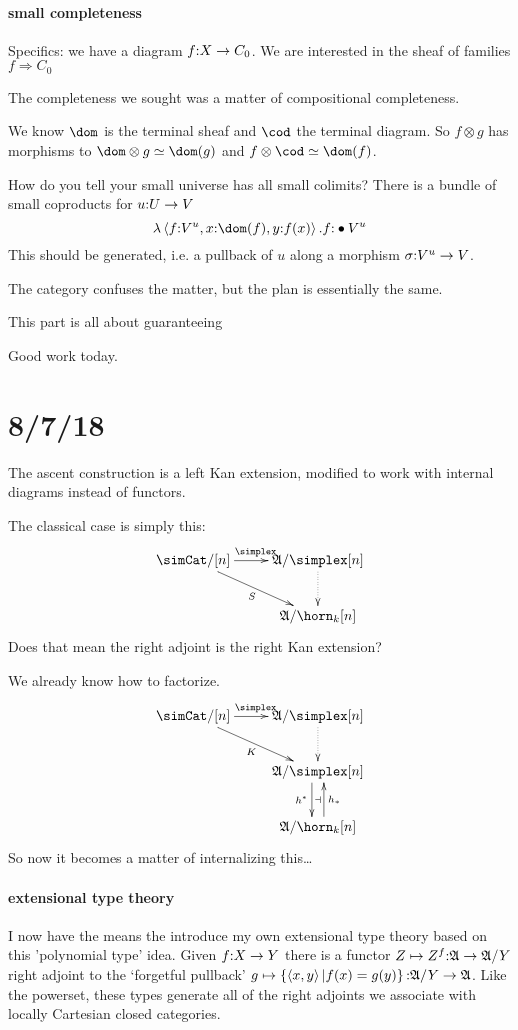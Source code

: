 \documentclass[csh.tex]{subfiles}
\begin{document}
\paragraph{small completeness}

Specifics: we have a diagram $f\mathord : X \to C_0$. We are interested in the sheaf of families $f\Rightarrow C_0$

The completeness we sought was a matter of compositional completeness.

We know $\dom$ is the terminal sheaf and $\cod$ the terminal diagram.
So $f\otimes g$ has morphisms to $\dom\otimes g \simeq \dom(g)$ and $f\otimes\cod \simeq \dom(f)$.

How do you tell your small universe has all small colimits?
There is a bundle of small coproducts for $u\mathord : U\to V$
\[\function{ \tuplet{f\of V^u,x\of \dom(f),y\of f(x)} } f\of\bullet V^u\]
This should be generated, i.e. a pullback of $u$ along a morphism $\sigma\mathord : V^u\to V$.

The category confuses the matter,
but the plan is essentially the same.

This part is all about guaranteeing 

Good work today.

\section{8/7/18}
The ascent construction is a left Kan extension, modified to work with internal diagrams instead of functors.

The classical case is simply this:
\[\xymatrix{
\simCat/[n] \ar[r]^\simplex\ar[dr]_{S} & \ambient/\simplex[n]\ar@{.>}[d] \\
& \ambient/\horn_k[n]
}\]
Does that mean the right adjoint is the right Kan extension?

We already know how to factorize.
\[\xymatrix{
\simCat/[n] \ar[r]^\simplex\ar[dr]_{K} & \ambient/\simplex[n]\ar@{.>}[d] \\
& \ambient/\simplex[n] \ar@<-1ex>[d]_{h\ri}\ar@{}[d]|\dashv\\
& \ambient/\horn_k[n] \ar@<-1ex>[u]_{h_*}
}\]
So now it becomes a matter of internalizing this\dots

\paragraph{extensional type theory}
I now have the means the introduce my own extensional type theory based on this 'polynomial type' idea. Given $f\mathord : X\to Y$ there is a functor $Z\mapsto Z^f\mathord : \mathfrak A\to \mathfrak A/Y$ right adjoint to the `forgetful pullback' $g \mapsto\left\{\left\langle x,y \right\rangle|f(x)=g(y)\right\} \mathord :\mathfrak A/Y\to \mathfrak A$. Like the powerset, these types generate all of the right adjoints we associate with locally Cartesian closed categories.
\end{document}

